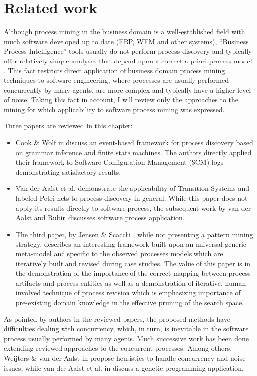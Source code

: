 \chapter{Related work} \label{related.work}
Although process mining in the business domain is a well-established field with much software developed up to date (ERP, WFM and other systems), ``Business Process Intelligence'' tools usually do not perform process discovery and typically offer relatively simple analyses that depend upon a correct a-priori process model \cite{citeulike:3718014} \cite{citeulike:5044991}. This fact restricts direct application of business domain process mining techniques to software engineering, where processes are usually performed concurrently by many agents, are more complex and typically have a higher level of noise. Taking this fact in account, I will review only the approaches to the mining for which applicability to software process mining was expressed. 

Three papers are reviewed in this chapter: 
\begin{itemize}
	\item Cook \& Wolf in \cite{citeulike:328044} discuss an event-based framework for process discovery based on grammar inference and finite state machines. The authors directly applied their framework to Software Configuration Management (SCM) logs demonstrating satisfactory results. 
	\item Van der Aalst et al. \cite{citeulike:3718014} demonstrate the applicability of Transition Systems and labeled Petri nets to process discovery in general. While this paper does not apply its results directly to software process, the subsequent work by van der Aalst and Rubin \cite{citeulike:1885717} discusses software process application.
	\item The third paper, by Jensen \& Scacchi \cite{citeulike:5043664}, while not presenting a pattern mining strategy, describes an interesting framework built upon an universal generic meta-model and specific to the observed processes models which are iteratively built and revised during case studies. The value of this paper is in the demonstration of the importance of the correct mapping between process artifacts and process entities as well as a demonstration of iterative, human-involved technique of process revision which is emphasizing importance of pre-existing domain knowledge in the effective pruning of the search space.
\end{itemize}
As pointed by authors in the reviewed papers, the proposed methods have difficulties dealing with concurrency, which, in turn, is inevitable in the software process usually performed by many agents. Much successive work has been done extending reviewed approaches to the concurrent processes. Among others, Weijters \& van der Aalst in \cite{citeulike:5128101} propose heuristics to handle concurrency and noise issues, while van der Aalst et al. in \cite{citeulike:5128110} discuss a genetic programming application. 
